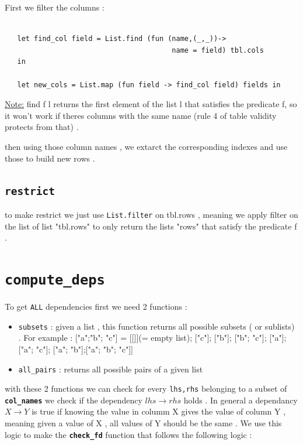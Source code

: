 \documentclass[11pt]{article}
\begin{document}
First we filter the columns : 
\begin{lstlisting}
      
   let find_col field = List.find (fun (name,(_,_))->
                                        name = field) tbl.cols
   in 
   
   let new_cols = List.map (fun field -> find_col field) fields in 
\end{lstlisting}
\underline{Note:} find f l returns the first element of the list l that satisfies the predicate f, so it won't work if theres columns with the same name (rule 4 of table validity protects from that) . 

then using those column names , we extarct the corresponding indexes and use those to build new rows .

\subsection{\texttt{restrict}}
to make restrict we just use \texttt{List.filter} on tbl.rows , meaning we apply filter on the list of list "tbl.rows" to only return the lists "rows" that satisfy the predicate f .\\
\section{\texttt{compute\_deps}}

To get \texttt{ALL} dependencies first we need 2 functions : 

\begin{itemize}
    \item \texttt{subsets} : given a list , this function returns all possible subsets ( or sublists) . For example : ["a";"b"; "c"] = [[]](= empty list); ["c"]; ["b"]; ["b"; "c"]; ["a"]; ["a"; "c"]; ["a"; "b"];["a"; "b"; "c"]]

    \item \texttt{all\_pairs} : returns all possible pairs of a given list 
\end{itemize}

with these 2 functions we can check for every \texttt{lhs,rhs} belonging to a subset of \textbf{\texttt{col\_names}} we check if the dependency $lhs\rightarrow rhs$ holds  . In general a dependancy $X \rightarrow Y$ is true if knowing the value in columm X gives the value of column Y , meaning given a value of X , all values of Y should be the same . We use this logic to make the \textbf{\texttt{check\_fd}} function that follows the following logic : 
\end{document}
